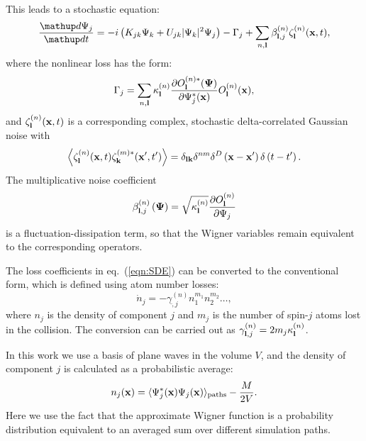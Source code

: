 This leads to a stochastic equation:
\begin{equation}
\label{eqn:SDE}
    \frac{\upd\Psi_j}{\upd t} =
        - i\left( K_{jk} \Psi_k + U_{jk} \lvert \Psi_k \rvert^{2} \Psi_j \right)
        - \Gamma_j
        + \sum_{n,\lvec} \beta_{\lvec,j}^{(n)} \zeta_{\lvec}^{(n)}(\xvec,t),
\end{equation}
where the nonlinear loss has the form:
\begin{equation}
    \Gamma_j = \sum_{n,\mathbf{l}}
        \kappa_{\mathbf{l}}^{(n)}
        \frac{\partial O_{\mathbf{l}}^{(n)*} (\mathbf{\Psi})}{\partial\Psi_j^{*} (\mathbf{x})}
        O_{\mathbf{l}}^{(n)}(\mathbf{x}),
\end{equation}
and $\zeta_{\mathbf{l}}^{(n)}(\mathbf{x}, t)$ is a corresponding complex,
stochastic delta-correlated Gaussian noise with
\begin{equation}
    \left\langle
        \zeta_{\mathbf{l}}^{(n)} (\mathbf{x},t) \zeta_{\mathbf{k}}^{(m)*}(\mathbf{x}^\prime, t^\prime)
    \right\rangle =
    \delta_{\mathbf{l} \mathbf{k}} \delta^{nm} \delta^{D} \left(
        \mathbf{x} - \mathbf{x}^\prime
    \right)
    \delta \left( t - t^\prime \right).
\end{equation}
The multiplicative noise coefficient
\begin{equation}
    \beta_{\mathbf{l},j}^{(n)} \left( \mathbf{\Psi} \right) =
    \sqrt{\kappa_{\mathbf{l}}^{(n)}}
    \frac{\partial O_{\mathbf{l}}^{(n)}}{\partial\Psi_j}
\end{equation}
is a fluctuation-dissipation term,
so that the Wigner variables remain equivalent to the corresponding operators.

The loss coefficients in eq.~(\ref{eqn:SDE}) can be converted to the conventional form,
which is defined using atom number losses:
\begin{equation}
    \dot{n}_j = - \gamma^{(n)}_{\lvec,j} n^{m_1}_1 n^{m_2}_2 \ldots ,
\end{equation}
where $n_j$ is the density of component $j$ and $m_j$
is the number of spin-$j$ atoms lost in the collision.
The conversion can be carried out as $\gamma^{(n)}_{\mathbf{l},j} = 2 m_j \kappa^{(n)}_{\mathbf{l}}$.

In this work we use a basis of plane waves in the volume $V$,
and the density of component $j$ is calculated as a probabilistic average:
\begin{equation}
\label{eqn:wigner-density}
    n_j (\mathbf{x})
        = \langle \Psi^*_j (\mathbf{x}) \Psi_j (\mathbf{x}) \rangle_{\mathrm{paths}} - \frac{M}{2V}.
\end{equation}
Here we use the fact that the approximate Wigner function is a probability distribution
equivalent to an averaged sum over different simulation paths.

